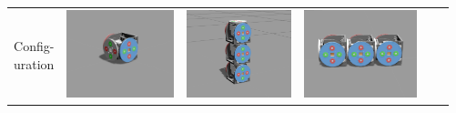 \documentclass[a4paper, landscape]{article}
\newcommand{\picHeight}{1in}
\begin{document}
        \begin{tabular}{| c | c | c | c | c | c |}
            \hline
            \pbox{20cm}{Config-\\uration} &
            \includegraphics[height=\picHeight]{driver1.png} &
            \includegraphics[height=\picHeight]{leg3.png} &
            \includegraphics[height=\picHeight]{body3.png} &

\end{tabular}
\end{document}
